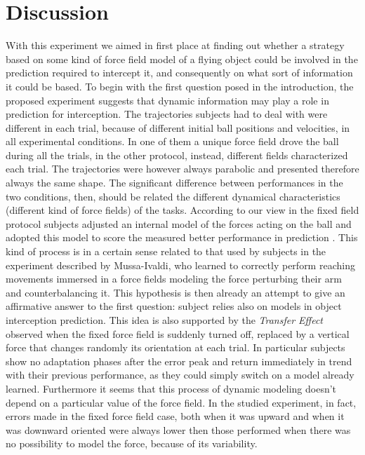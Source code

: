 \section{Discussion} \label{Discussion}

With this experiment we aimed in first place at finding out whether a strategy based on some kind of force field model of a flying object could be involved in the prediction required to intercept it, and consequently on what sort of information it could be based.
To begin with the first question posed in the introduction, the proposed experiment suggests that dynamic information may play a role in prediction for interception. The trajectories subjects had to deal with were different in each trial, because of different initial ball positions and velocities, in all experimental conditions. In one of them a unique force field drove the ball during all the trials, in the other protocol, instead, different fields characterized each trial. The trajectories were however always parabolic and presented therefore always the same shape. The significant difference between performances in the two conditions, then, should be related the different dynamical characteristics (different kind of force fields) of the tasks. According to our view in the fixed field protocol subjects adjusted an internal model of the forces acting on the ball and adopted this model to score the measured better performance in prediction .
This kind of process is in a certain sense related to that used by subjects in the experiment described by Mussa-Ivaldi, who learned to correctly perform reaching movements immersed in a force fields modeling the force perturbing their arm and counterbalancing it. This hypothesis is then already an attempt to give an affirmative answer to the first question: subject relies also on models in object interception prediction.
This idea is also supported by the \textit{Transfer Effect} observed when the fixed force field is suddenly turned off, replaced by a vertical force that changes randomly its orientation at each trial. In particular subjects show no adaptation phases after the error peak and return immediately in trend with their previous performance, as they could simply switch on a model already learned.
Furthermore it seems that this process of dynamic modeling doesn't depend on a particular value of the force field. In the studied experiment, in fact, errors made in the fixed force field case, both when it was upward and when it was downward oriented were always lower then those performed when there was no possibility to model the force, because of its variability.

